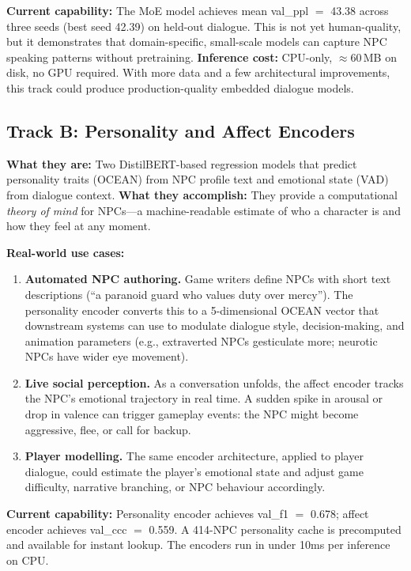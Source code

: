 \documentclass[11pt]{article}
\begin{document}
\textbf{Current capability:} The MoE model achieves mean val\_ppl $=$ 43.38 across three seeds (best seed 42.39) on held-out dialogue.
This is not yet human-quality, but it demonstrates that domain-specific, small-scale models can capture NPC speaking patterns without pretraining.
\textbf{Inference cost:} CPU-only, $\approx$60\,MB on disk, no GPU required.
With more data and a few architectural improvements, this track could produce production-quality embedded dialogue models.

\subsection{Track B: Personality and Affect Encoders}

\textbf{What they are:} Two DistilBERT-based regression models that predict personality traits (OCEAN) from NPC profile text and emotional state (VAD) from dialogue context.
\textbf{What they accomplish:} They provide a computational \textit{theory of mind} for NPCs---a machine-readable estimate of who a character is and how they feel at any moment.

\textbf{Real-world use cases:}
\begin{enumerate}
    \item \textbf{Automated NPC authoring.} Game writers define NPCs with short text descriptions (``a paranoid guard who values duty over mercy'').
    The personality encoder converts this to a 5-dimensional OCEAN vector that downstream systems can use to modulate dialogue style, decision-making, and animation parameters (e.g., extraverted NPCs gesticulate more; neurotic NPCs have wider eye movement).
    \item \textbf{Live social perception.} As a conversation unfolds, the affect encoder tracks the NPC's emotional trajectory in real time.
    A sudden spike in arousal or drop in valence can trigger gameplay events: the NPC might become aggressive, flee, or call for backup.
    \item \textbf{Player modelling.} The same encoder architecture, applied to player dialogue, could estimate the player's emotional state and adjust game difficulty, narrative branching, or NPC behaviour accordingly.
\end{enumerate}

\textbf{Current capability:} Personality encoder achieves val\_f1 $=$ 0.678; affect encoder achieves val\_ccc $=$ 0.559.
A 414-NPC personality cache is precomputed and available for instant lookup.
The encoders run in under 10ms per inference on CPU.
\end{document}
